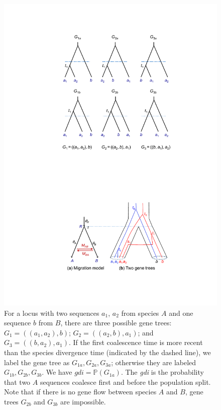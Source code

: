 \documentclass[A4]{article1}
\renewcommand{\P}{\mathbb{P}}
\begin{document}
\begin{figure} [t]
   \centering %
   \includegraphics[scale=0.6]{figs/fig-gdi-trees} %
   
   \caption{For a locus with two sequences $a_1$, $a_2$ from species $A$ and one
      sequence $b$ from $B$, there are three possible gene trees: $G_1 = ((a_1, a_2), b)$;
      $G_2 = ((a_2, b), a_1)$; and $G_3 = ((b, a_2), a_1)$.  If the first coalescence time
      is more recent than the species divergence time (indicated by the dashed line), we
      label the gene tree as $G_{1a}, G_{2a}, G_{3a}$; otherwise they are labeled $G_{1b},
      G_{2b}, G_{3b}$.  We have $gdi = \P(G_{1a})$.  The \textit{gdi} is the probability
      that two $A$ sequences coalesce first and before the population split.  Note that if
      there is no gene flow between species $A$ and $B$, gene trees $G_{2b}$ and $G_{3b}$
      are impossible.  %
   } \label{fig:gdi-trees}
\end{figure}
\end{document}
